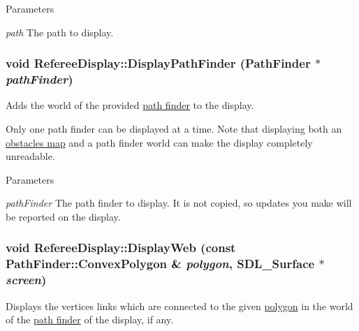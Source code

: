 \begin{DoxyParams}{Parameters}
\item[{\em path}]The path to display. \end{DoxyParams}
\hypertarget{classRefereeDisplay_a0ef334a53e0fde02da30460ed2fcbe06}{
\subsubsection[{DisplayPathFinder}]{\setlength{\rightskip}{0pt plus 5cm}void RefereeDisplay::DisplayPathFinder ({\bf PathFinder} $\ast$ {\em pathFinder})}}
\label{classRefereeDisplay_a0ef334a53e0fde02da30460ed2fcbe06}


Adds the world of the provided \hyperlink{classPathFinder}{path finder} to the display. 

Only one path finder can be displayed at a time. Note that displaying both an \hyperlink{classInterpreter_a4c080f069f557cf92dfe803117a6ea53}{obstacles map} and a path finder world can make the display completely unreadable.


\begin{DoxyParams}{Parameters}
\item[{\em pathFinder}]The path finder to display. It is not copied, so updates you make will be reported on the display. \end{DoxyParams}
\hypertarget{classRefereeDisplay_ae40cc8040d1fe441a8f38fe2fc0b8974}{
\subsubsection[{DisplayWeb}]{\setlength{\rightskip}{0pt plus 5cm}void RefereeDisplay::DisplayWeb (const {\bf PathFinder::ConvexPolygon} \& {\em polygon}, \/  SDL\_\-Surface $\ast$ {\em screen})}}
\label{classRefereeDisplay_ae40cc8040d1fe441a8f38fe2fc0b8974}


Displays the vertices links which are connected to the given \hyperlink{structPathFinder_1_1ConvexPolygon}{polygon} in the world of the \hyperlink{classPathFinder}{path finder} of the display, if any. 



